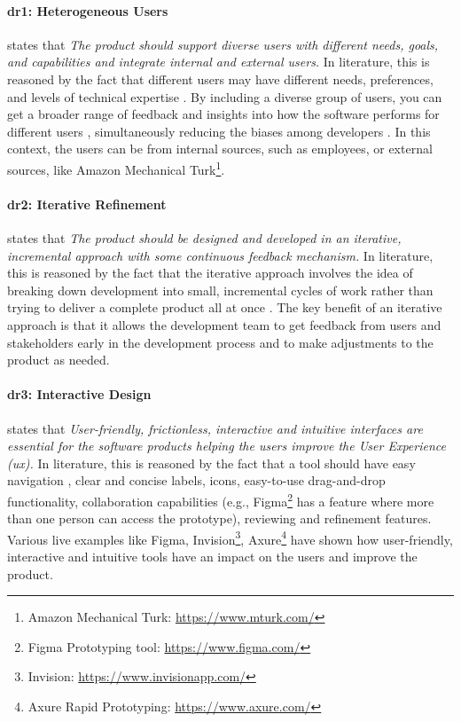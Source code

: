 \paragraph{\ac{dr}1: Heterogeneous Users} states that \textit{The product should support diverse users with different needs, goals, and capabilities and integrate internal and external users.} 
In literature, this is reasoned by the fact that different users may have different needs, preferences, and levels of technical expertise \cite{misc:lean:steve}.
By including a diverse group of users, you can get a broader range of feedback and insights into how the software performs for different users \cite{article:prototyping:weichbroth}, simultaneously reducing the biases among developers \cite{misc:lean:burmeister}.
In this context, the users can be from internal sources, such as employees, or external sources, like Amazon Mechanical Turk\footnote{Amazon Mechanical Turk: \url{https://www.mturk.com/}}.

\paragraph{\ac{dr}2: Iterative Refinement} states that \textit{The product should be designed and developed in an iterative, incremental approach with some continuous feedback mechanism.} 
In literature, this is reasoned by the fact that the iterative approach involves the idea of breaking down development into small, incremental cycles of work rather than trying to deliver a complete product all at once \cite{misc:lean:tutorial}.
The key benefit of an iterative approach is that it allows the development team to get feedback from users and stakeholders early in the development process and to make adjustments \cite{article:experiments:lindgren} to the product as needed.

\paragraph{\ac{dr}3: Interactive Design} states that \textit{User-friendly, frictionless, interactive and intuitive interfaces are essential for the software products helping the users improve the User Experience (\ac{ux}).} 
In literature, this is reasoned by the fact that a tool should have easy navigation \cite{article:prototyping:hoffnagle}, clear and concise labels, icons, easy-to-use drag-and-drop functionality, collaboration capabilities (e.g., Figma\footnote{Figma Prototyping tool: \url{https://www.figma.com/}} has a feature where more than one person can access the prototype), reviewing and refinement \cite{paper:prototyping:luqi} features.
Various live examples like Figma, Invision\footnote{Invision: \url{https://www.invisionapp.com/}}, Axure\footnote{Axure Rapid Prototyping: \url{https://www.axure.com/}} have shown how user-friendly, interactive and intuitive tools have an impact on the users and improve the product.

